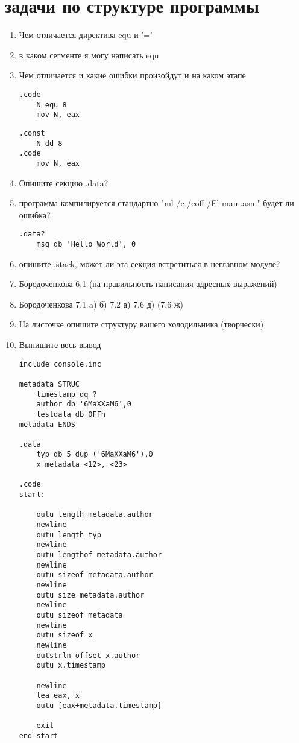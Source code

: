\documentclass[a4paper,10pt]{article}
\begin{document}
\section*{задачи по структуре программы}
\begin{enumerate}
    \item Чем отличается директива equ и '='
    \item в каком сегменте я могу написать equ
    \item Чем отличается и какие ошибки произойдут и на каком этапе
    \begin{multicols}{2}
\begin{verbatim}
.code
    N equ 8
    mov N, eax
\end{verbatim}
        \columnbreak
\begin{verbatim}
.const
    N dd 8
.code
    mov N, eax
\end{verbatim}
    \end{multicols}
    \item Опишите секцию .data?
    \item программа компилируется стандартно "ml /c /coff /Fl main.asm" будет ли ошибка?
\begin{verbatim}
.data?
    msg db 'Hello World', 0
\end{verbatim}
    \item опишите .stack, может ли эта секция встретиться в неглавном модуле?
    \item Бородоченкова 6.1 (на правильность написания адресных выражений)
    \item Бородоченкова 7.1 a) б) 7.2 а) 7.6 д) (7.6 ж)
    \item На листочке опишите структуру вашего холодильника (творчески)
    \item Выпишите весь вывод
\begin{verbatim}
include console.inc

metadata STRUC
    timestamp dq ?
    author db '6MaXXaM6',0
    testdata db 0FFh
metadata ENDS

.data
    typ db 5 dup ('6MaXXaM6'),0
    x metadata <12>, <23>

.code
start: 
    
    outu length metadata.author
    newline
    outu length typ
    newline
    outu lengthof metadata.author
    newline
    outu sizeof metadata.author
    newline
    outu size metadata.author
    newline
    outu sizeof metadata
    newline
    outu sizeof x
    newline
    outstrln offset x.author
    outu x.timestamp

    newline
    lea eax, x
    outu [eax+metadata.timestamp]

    exit
end start
\end{verbatim}
\end{enumerate}
\end{document}
